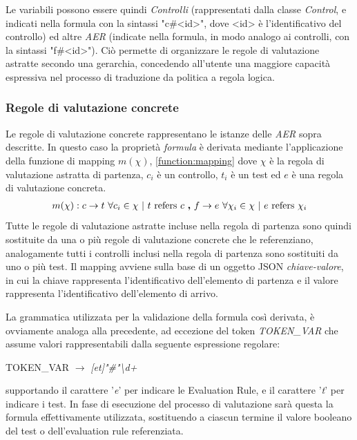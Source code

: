 \documentclass[../main.tex]{subfiles}
\begin{document}
Le variabili possono essere quindi \textit{Controlli} (rappresentati dalla classe \textit{Control}, e indicati nella formula con la sintassi "c\#<id>", dove <id> è l'identificativo del controllo) ed altre \textit{AER} (indicate nella formula, in modo analogo ai controlli, con la sintassi "f\#<id>"). Ciò permette di organizzare le regole di valutazione astratte secondo una gerarchia, concedendo all'utente una maggiore capacità espressiva nel processo di traduzione da politica a regola logica.


\subsubsection{Regole di valutazione concrete}

Le regole di valutazione concrete rappresentano le istanze delle \textit{AER} sopra descritte.
In questo caso la proprietà \textit{formula} è derivata mediante l'applicazione della funzione di mapping $m(\chi)$, \eqref{function:mapping} dove $\chi$ è la regola di valutazione astratta di partenza, $c_i$ è un controllo, $t_i$ è un test ed $e$ è una regola di valutazione concreta.
\begin{equation}
\begin{gathered}
m(\chi):
c \rightarrow t ~ \forall c_i \in \chi ~ | ~ t ~ \text{refers} ~ c ~ \text{\textbf{,}} ~
        f \rightarrow e ~ \forall \chi_i \in \chi ~ | ~ e ~ \text{refers} ~ \chi_i
\end{gathered}
\label{function:mapping}
\end{equation}
Tutte le regole di valutazione astratte incluse nella regola di partenza sono quindi sostituite da una o più regole di valutazione concrete che le referenziano, analogamente tutti i controlli inclusi nella regola di partenza sono sostituiti da uno o più test.
Il mapping avviene sulla base di un oggetto JSON \textit{chiave-valore}, in cui la chiave rappresenta l'identificativo dell'elemento di partenza e il valore rappresenta l'identificativo dell'elemento di arrivo.

La grammatica utilizzata per la validazione della formula così derivata, è ovviamente analoga alla precedente, ad eccezione del token \textit{TOKEN\_VAR} che assume valori rappresentabili dalla seguente espressione regolare:
\begin{center}
    TOKEN\_VAR $\rightarrow$ \textit{[et]"\#"\textbackslash d+}
\end{center}
supportando il carattere '\textit{e}' per indicare le Evaluation Rule, e il carattere '\textit{t}' per indicare i test.
In fase di esecuzione del processo di valutazione sarà questa la formula effettivamente utilizzata, sostituendo a ciascun termine il valore booleano del test o dell'evaluation rule referenziata.
\vfill
\newpage
\end{document}
